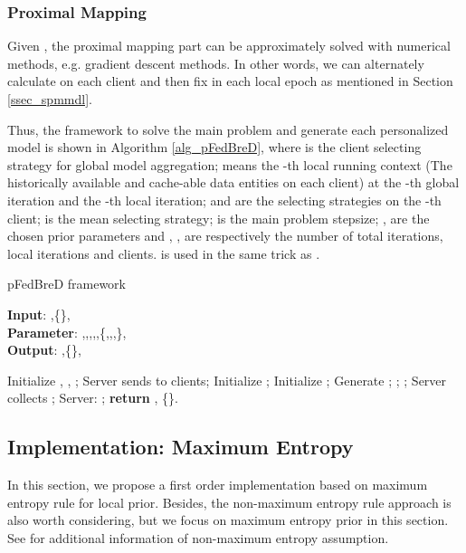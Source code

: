 \documentclass{article}
\begin{document}
\subsubsection{Proximal Mapping}
\label{sssec_alg_pm}

Given ,  the proximal mapping part  can be approximately solved with numerical methods, e.g. gradient descent methods. In other words, we can alternately calculate  on each client and then fix  in each local epoch as mentioned in Section \ref{ssec_spmmdl}.

Thus, the framework to solve the main problem and generate each personalized model is shown in Algorithm \ref{alg_pFedBreD}, where  is the client selecting strategy for global model aggregation;  means the -th local running context (The historically available and cache-able data entities on each client) at the -th global iteration and the -th local iteration;  and  are the selecting strategies on the -th client;  is the mean selecting strategy;  is the main problem stepsize; ,  are the chosen prior parameters and , ,  are respectively the number of total iterations, local iterations and clients.  is used in the same trick as \cite{karimireddy2020scaffold, t2020personalized}.

\begin{algorithm}[tb]
\caption{pFedBreD framework}  
\label{alg_pFedBreD}
\textbf{Input}: ,\{\}, \\
\textbf{Parameter}: ,,,,,\{,,,\},\\
\textbf{Output}: ,\{\}, 
\begin{algorithmic}[1]
\STATE Initialize , , ;
\STATE Server sends  to clients;
\STATE Initialize ;
\STATE Initialize ;
\STATE Generate ;
\STATE ;
\STATE ;
\ENDFOR
\ENDFOR
\STATE Server collects ;
\STATE Server: ;
\ENDFOR
\STATE \textbf{return} , \{\}.
\end{algorithmic}
\end{algorithm}

\subsection{Implementation: Maximum Entropy}
\label{ssec_ime}

In this section, we propose a first order implementation based on maximum entropy rule \cite{friedman1971jaynes, jaynes1957information} for local prior. Besides, the non-maximum entropy rule approach is also worth considering, but we focus on maximum entropy prior in this section. See \cite{seidenfeld1979not, genest1986combining, kass1996selection, gelman2013philosophy} for additional information of non-maximum entropy assumption.
\end{document}
